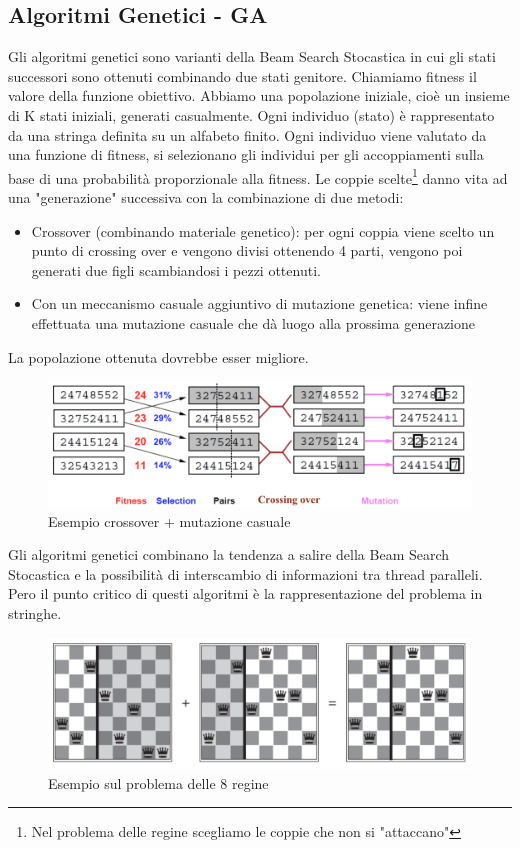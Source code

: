 \documentclass{article}
\begin{document}
\subsection{Algoritmi Genetici - GA}
Gli algoritmi genetici sono varianti della Beam Search Stocastica in cui gli stati successori sono ottenuti combinando due stati genitore. Chiamiamo fitness il valore della funzione obiettivo. \newline
Abbiamo una popolazione iniziale, cioè un insieme di K stati iniziali, generati casualmente. Ogni individuo (stato) è rappresentato da una stringa definita su un alfabeto finito. Ogni individuo viene valutato da una funzione di fitness, si selezionano gli individui per gli accoppiamenti sulla base di una probabilità proporzionale alla fitness. Le coppie scelte\footnote{Nel problema delle regine scegliamo le coppie che non si "attaccano"} danno vita ad una "generazione" successiva con la combinazione di due metodi:
\begin{itemize}
    \item Crossover (combinando materiale genetico): per ogni coppia viene scelto un punto di crossing over e vengono divisi ottenendo 4 parti, vengono poi generati due figli scambiandosi i pezzi ottenuti.
    \item Con un meccanismo casuale aggiuntivo di mutazione genetica: viene infine effettuata una mutazione casuale che dà luogo alla prossima generazione
\end{itemize}
La popolazione ottenuta dovrebbe esser migliore.
\begin{figure}[H]
    \centering
    \includegraphics[scale=0.5]{Images/alggeneticicross.png}
    \caption{Esempio crossover + mutazione casuale}
\end{figure}
Gli algoritmi genetici combinano la tendenza a salire della Beam Search Stocastica e la possibilità di interscambio di informazioni tra thread paralleli. Pero il punto critico di questi algoritmi è la rappresentazione del problema in stringhe.
\begin{figure}[H]
    \centering
    \includegraphics[scale=0.5]{Images/alggenscacchi.png}
    \caption{Esempio sul problema delle 8 regine}
\end{figure}
\end{document}
